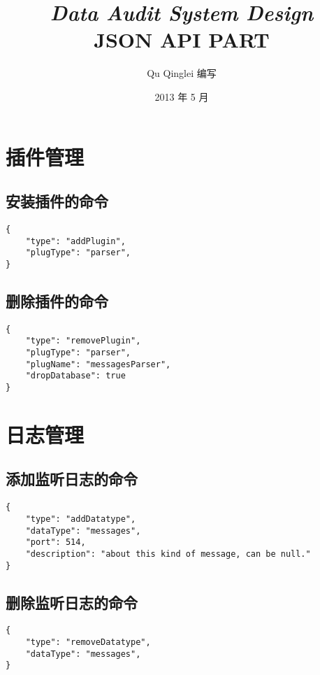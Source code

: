 \documentclass{article}
\begin{document}
\title{%
  {\huge \textit{Data Audit System Design}\\\smallskip}%
  {\LARGE \textsf{JSON API PART}}
}

\author{Qu Qinglei 编写 \\[3mm]
       }

\date{2013 年 5 月}

\maketitle

\begin{multicols}{2}
\tableofcontents
\end{multicols}

\section{插件管理}
\subsection{安装插件的命令}
\begin{verbatim}
{
    "type": "addPlugin",
    "plugType": "parser",
}
\end{verbatim}

\subsection{删除插件的命令}
\begin{verbatim}
{
    "type": "removePlugin",
    "plugType": "parser",
    "plugName": "messagesParser",
    "dropDatabase": true
}
\end{verbatim}


\section{日志管理}
\subsection{添加监听日志的命令}
\begin{verbatim}
{
    "type": "addDatatype",
    "dataType": "messages",
    "port": 514,
    "description": "about this kind of message, can be null."
}
\end{verbatim}

\subsection{删除监听日志的命令}
\begin{verbatim}
{
    "type": "removeDatatype",
    "dataType": "messages",
}
\end{verbatim}
\end{document}

